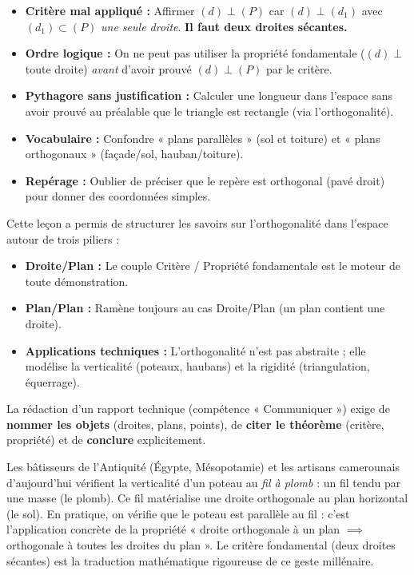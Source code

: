 \documentclass[11pt]{article}
\newcommand{\cle}[1]{{\popxbold\color{popdark}#1}}
\newcounter{popsec}
\newcounter{popsub}
\newcommand{\courssub}[1]{%
  \stepcounter{popsub}%
  \par\vspace{9pt}\noindent{\popxbold\fontsize{11.5}{13}\selectfont\color{popink}{\color{poporange}\thepopsec.\thepopsub}\hspace{6pt}#1}\par\nopagebreak\vspace{4pt}
}
\begin{document}
\begin{attention}
\begin{itemize}
    \item \textbf{Critère mal appliqué :} Affirmer $(d) \perp (P)$ car $(d) \perp (d_1)$ avec $(d_1) \subset (P)$ \emph{une seule droite}. \textbf{Il faut deux droites sécantes.}
    \item \textbf{Ordre logique :} On ne peut pas utiliser la propriété fondamentale ($(d) \perp$ toute droite) \emph{avant} d'avoir prouvé $(d) \perp (P)$ par le critère.
    \item \textbf{Pythagore sans justification :} Calculer une longueur dans l'espace sans avoir prouvé au préalable que le triangle est rectangle (via l'orthogonalité).
    \item \textbf{Vocabulaire :} Confondre « plans parallèles » (sol et toiture) et « plans orthogonaux » (façade/sol, hauban/toiture).
    \item \textbf{Repérage :} Oublier de préciser que le repère est orthogonal (pavé droit) pour donner des coordonnées simples.
\end{itemize}
\end{attention}

\courssub{Bilan de la leçon}

Cette leçon a permis de structurer les savoirs sur l'orthogonalité dans l'espace autour de trois piliers :
\begin{itemize}
    \item \textbf{Droite/Plan :} Le couple Critère / Propriété fondamentale est le moteur de toute démonstration.
    \item \textbf{Plan/Plan :} Ramène toujours au cas Droite/Plan (un plan contient une droite).
    \item \textbf{Applications techniques :} L'orthogonalité n'est pas abstraite ; elle modélise la \cle{verticalité} (poteaux, haubans) et la \cle{rigidité} (triangulation, équerrage).
\end{itemize}
La rédaction d'un rapport technique (compétence « Communiquer ») exige de \textbf{nommer les objets} (droites, plans, points), de \textbf{citer le théorème} (critère, propriété) et de \textbf{conclure} explicitement.

\begin{savaistu}
Les bâtisseurs de l'Antiquité (Égypte, Mésopotamie) et les artisans camerounais d'aujourd'hui vérifient la verticalité d'un poteau au \emph{fil à plomb} : un fil tendu par une masse (le plomb). Ce fil matérialise une droite orthogonale au plan horizontal (le sol). En pratique, on vérifie que le poteau est parallèle au fil : c'est l'application concrète de la propriété « droite orthogonale à un plan $\implies$ orthogonale à toutes les droites du plan ». Le critère fondamental (deux droites sécantes) est la traduction mathématique rigoureuse de ce geste millénaire.
\end{savaistu}
\end{document}
